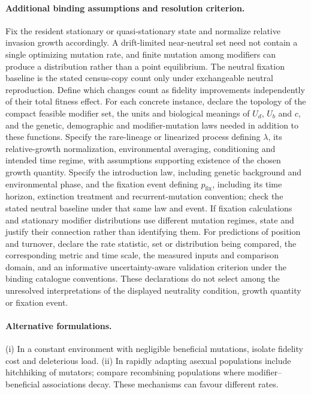 \documentclass[11pt]{article}
\begin{document}
\paragraph{Additional binding assumptions and resolution criterion.} Fix the resident stationary or quasi-stationary state and normalize relative invasion growth accordingly. A drift-limited near-neutral set need not contain a single optimizing mutation rate, and finite mutation among modifiers can produce a distribution rather than a point equilibrium. The neutral fixation baseline is the stated census-copy count only under exchangeable neutral reproduction. Define which changes count as fidelity improvements independently of their total fitness effect. For each concrete instance, declare the topology of the compact feasible modifier set, the units and biological meanings of $U_d$, $U_b$ and $c$, and the genetic, demographic and modifier-mutation laws needed in addition to these functions. Specify the rare-lineage or linearized process defining $\lambda$, its relative-growth normalization, environmental averaging, conditioning and intended time regime, with assumptions supporting existence of the chosen growth quantity. Specify the introduction law, including genetic background and environmental phase, and the fixation event defining $p_{\mathrm{fix}}$, including its time horizon, extinction treatment and recurrent-mutation convention; check the stated neutral baseline under that same law and event. If fixation calculations and stationary modifier distributions use different mutation regimes, state and justify their connection rather than identifying them. For predictions of position and turnover, declare the rate statistic, set or distribution being compared, the corresponding metric and time scale, the measured inputs and comparison domain, and an informative uncertainty-aware validation criterion under the binding catalogue conventions. These declarations do not select among the unresolved interpretations of the displayed neutrality condition, growth quantity or fixation event.

\paragraph{Alternative formulations.} (i) In a constant environment with negligible beneficial mutations, isolate fidelity cost and deleterious load. (ii) In rapidly adapting asexual populations include hitchhiking of mutators; compare recombining populations where modifier--beneficial associations decay. These mechanisms can favour different rates.
\end{document}
